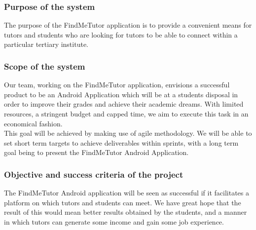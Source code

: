 \documentclass[12pt]{article}
\begin{document}
\subsubsection{Purpose of the system}
\begin{flushleft}
The purpose of the FindMeTutor application is to provide a convenient means for tutors and students who are looking for tutors to be able to connect within a particular tertiary institute.
\end{flushleft}
\subsubsection{Scope of the system}
\begin{flushleft}

Our team, working on the FindMeTutor application, envisions a successful product to be an Android Application which will be at a students disposal in order to improve their grades and achieve their academic dreams. With limited resources, a stringent budget and capped time, we aim to execute this task in an economical fashion.\\
This goal will be achieved by making use of agile methodology. We will be able to set short term targets to achieve deliverables within sprints, with a long term goal being to present the FindMeTutor Android Application.
\end{flushleft}
\subsubsection{Objective and success criteria of the project}
\begin{flushleft}
The FindMeTutor Android application will be seen as successful if it facilitates a platform on which tutors and students can meet. We have great hope that the result of this would mean better results obtained by the students, and a manner in which tutors can generate some income and gain some job experience.
\end{flushleft}
\end{document}
